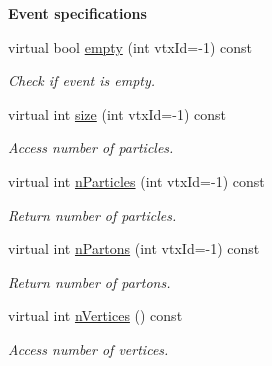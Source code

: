 \begin{Indent}{\bf Event specifications}\par
\begin{CompactItemize}
\item 
virtual bool \hyperlink{classEvent_91389b1bfa6a0d3647dd0e012be486a4}{empty} (int vtx\-Id=-1) const 
\begin{CompactList}\small\item\em Check if event is empty. \item\end{CompactList}\item 
virtual int \hyperlink{classEvent_b998d1732ade0fc0759d15819ca6ae08}{size} (int vtx\-Id=-1) const 
\begin{CompactList}\small\item\em Access number of particles. \item\end{CompactList}\item 
virtual int \hyperlink{classEvent_6cd988d4ea5b6312de8fd904de09517d}{n\-Particles} (int vtx\-Id=-1) const 
\begin{CompactList}\small\item\em Return number of particles. \item\end{CompactList}\item 
virtual int \hyperlink{classEvent_96a2728447b5b15b31e9ca132f8f4eab}{n\-Partons} (int vtx\-Id=-1) const 
\begin{CompactList}\small\item\em Return number of partons. \item\end{CompactList}\item 
virtual int \hyperlink{classEvent_c2f3b1843699e28c867a616194130dda}{n\-Vertices} () const 
\begin{CompactList}\small\item\em Access number of vertices. \item\end{CompactList}\end{CompactItemize}
\end{Indent}

